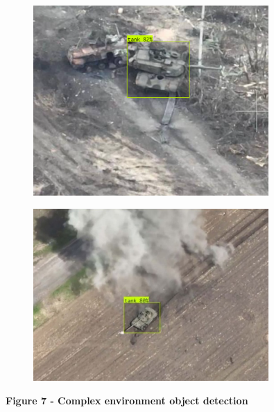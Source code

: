 \begin{figure}[H]
	\centering
	\includegraphics[width=0.8\textwidth]{assets/21}
	\caption*{}
\end{figure}\begin{figure}[H]
	\centering
	\includegraphics[width=0.8\textwidth]{assets/22}
	\caption*{}
\end{figure}

\textbf{Figure 7 - Complex environment object detection}

